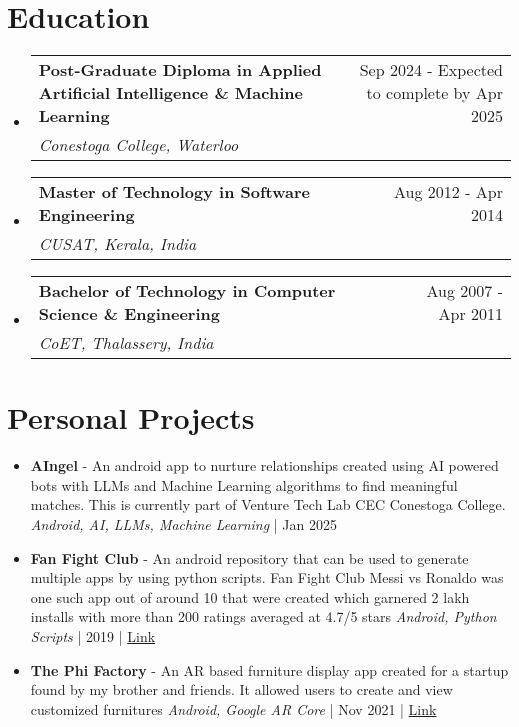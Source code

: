 \documentclass[11pt,a4paper]{article}
\makeatletter
\newcommand{\resumeSubheading}[4]{
  \vspace{-1pt}\item
    \begin{tabular*}{0.97\textwidth}[t]{l@{\extracolsep{\fill}}r}
      \textbf{#1} & #2 \\
      \textit{\small#3} & \textit{\small #4} \\
    \end{tabular*}\vspace{-5pt}
}
\makeatother
\begin{document}
\section{Education}
\begin{itemize}[leftmargin=0.15in, label={}]
\resumeSubheading
  {Post-Graduate Diploma in Applied Artificial Intelligence \& Machine Learning}{Sep 2024 - Expected to complete by Apr 2025}
  {Conestoga College, Waterloo}{}

\resumeSubheading
  {Master of Technology in Software Engineering}{Aug 2012 - Apr 2014}
  {CUSAT, Kerala, India}{}

\resumeSubheading
  {Bachelor of Technology in Computer Science \& Engineering}{Aug 2007 - Apr 2011}
  {CoET, Thalassery, India}{}


\end{itemize}

\section{Personal Projects}
\begin{itemize}[leftmargin=0.15in, label={}]
    \item \textbf{AIngel} - An android app to nurture relationships created using AI powered bots with LLMs and Machine Learning algorithms to find meaningful matches. This is currently part of Venture Tech Lab CEC Conestoga College.
          \textit{Android, AI, LLMs, Machine Learning} | Jan 2025

    \item \textbf{Fan Fight Club} - An android repository that can be used to generate multiple apps by using python scripts. Fan Fight Club Messi vs Ronaldo was one such app out of around 10 that were created which garnered 2 lakh installs with more than 200 ratings averaged at 4.7/5 stars
          \textit{Android, Python Scripts} | 2019 | \href{https://bitbucket.org/nikhilshankarcs/fanfightclub}{Link}

    \item \textbf{The Phi Factory} - An AR based furniture display app created for a startup found by my brother and friends. It allowed users to create and view customized furnitures
          \textit{Android, Google AR Core} | Nov 2021 | \href{https://bitbucket.org/nikhilshankarcs/phifactory}{Link}


\end{itemize}
\end{document}
